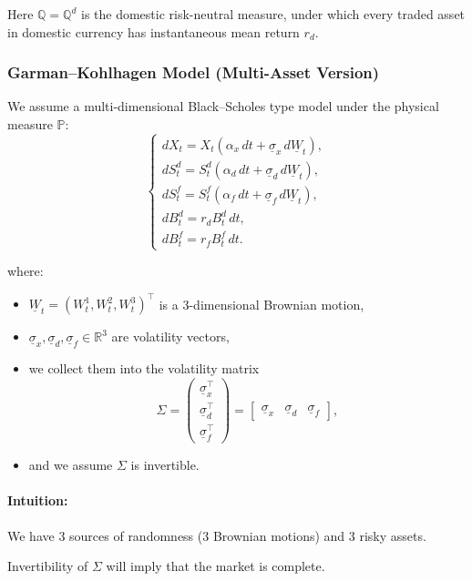 \documentclass[12pt,a4paper]{article}
\theoremstyle{definition}
\begin{document}
Here $\mathbb{Q} = \mathbb{Q}^d$ is the domestic risk-neutral measure, under which every traded asset in domestic currency has instantaneous mean return $r_d$.

\subsubsection{Garman--Kohlhagen Model (Multi-Asset Version)}

We assume a multi-dimensional Black--Scholes type model under the physical measure $\mathbb{P}$:
\[
\begin{cases}
dX_t = X_t(\alpha_x\, dt + \underline{\sigma}_x\, d\underline{W}_t), \\
dS_t^d = S_t^d(\alpha_d\, dt + \underline{\sigma}_d\, d\underline{W}_t), \\
dS_t^f = S_t^f(\alpha_f\, dt + \underline{\sigma}_f\, d\underline{W}_t), \\
dB_t^d = r_d B_t^d\, dt, \\
dB_t^f = r_f B_t^f\, dt.
\end{cases}
\]

where:
\begin{itemize}
\item $\underline{W}_t = (W_t^1, W_t^2, W_t^3)^\top$ is a 3-dimensional Brownian motion,
\item $\underline{\sigma}_x, \underline{\sigma}_d, \underline{\sigma}_f \in \mathbb{R}^3$ are volatility vectors,
\item we collect them into the volatility matrix
\[
\Sigma = \begin{pmatrix}
\underline{\sigma}_x^\top \\
\underline{\sigma}_d^\top \\
\underline{\sigma}_f^\top
\end{pmatrix}
= \begin{bmatrix}
\underline{\sigma}_x & \underline{\sigma}_d & \underline{\sigma}_f
\end{bmatrix},
\]
\item and we assume $\Sigma$ is invertible.
\end{itemize}

\paragraph{Intuition:}

We have 3 sources of randomness (3 Brownian motions) and 3 risky assets.

Invertibility of $\Sigma$ will imply that the market is complete.
\end{document}
